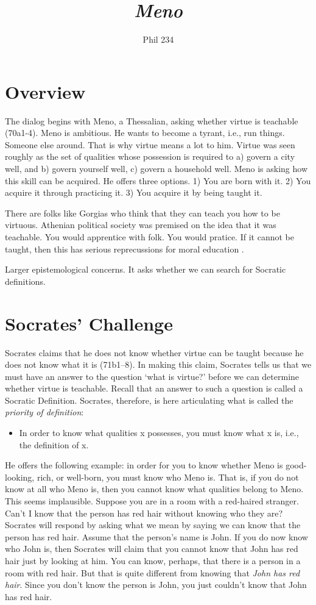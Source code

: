 \documentclass[10 pt]{article}
\begin{document}
\author{Phil 234}
\title{\emph{Meno}}
\maketitle

\section*{Overview}
The dialog begins with Meno, a Thessalian, asking whether virtue is teachable (70a1-4). Meno is ambitious. He wants to become a tyrant, i.e., run things. Someone else around. That is why virtue means a lot to him. Virtue was seen roughly as the set of qualities whose possession is required to a) govern a city well, and b) govern yourself well, c) govern a household well.  Meno is asking how this skill can be acquired. He offers three options. 1) You are born with it. 2) You acquire it through practicing it. 3) You acquire it by being taught it.

 There are folks like Gorgias who think that they can teach you how to be virtuous. Athenian political society was premised on the idea that it was teachable. You would apprentice with folk. You would pratice. If it cannot be taught, then  this has serious reprecussions for moral education . 

Larger epistemological concerns. It asks whether we can search for Socratic definitions. 


\section*{Socrates' Challenge}

Socrates claims that he does not know whether virtue can be taught because he does not know what it is (71b1--8). In making this claim, Socrates tells us that we must have an answer to the question `what is virtue?' before we can determine whether virtue is teachable. Recall that an answer to such a question is called a Socratic Definition. Socrates, therefore, is here articulating what is called the \emph{priority of definition}:
\begin{itemize}
\item In order to know what qualities x possesses, you must know what x is, i.e., the definition of x. 
\end{itemize}
He offers the following example: in order for you to know whether Meno is good-looking, rich, or well-born, you must know who Meno is. That is, if you do not know at all who Meno is, then you cannot know what qualities belong to Meno. This seems implausible. Suppose you are in a room with a red-haired stranger. Can't I know that the person has red hair without knowing who they are? Socrates will respond by asking what we mean by saying we can know that the person has red hair. Assume that the person's name is John. If you do now know who John is, then Socrates will claim that you cannot know that John has red hair just by looking at him. You can know, perhaps, that there is a person in a room with red hair. But that is quite different from knowing that \emph{John has red hair}. Since you don't know the person is John, you just couldn't know that John has red hair. 
\end{document}
